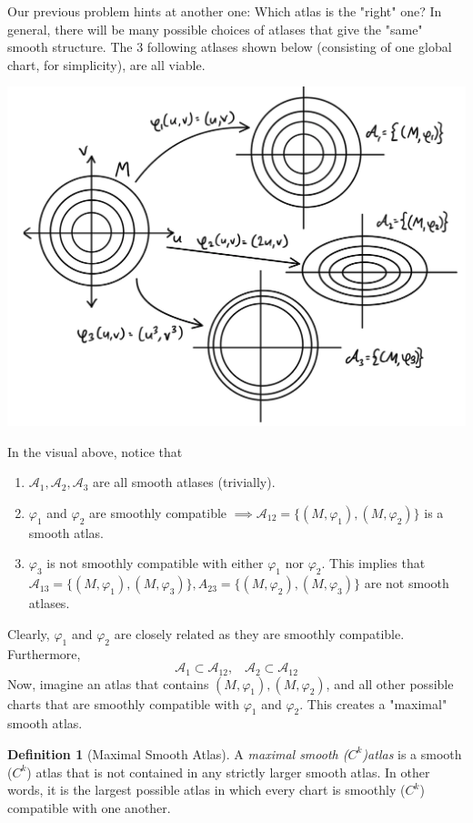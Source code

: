\documentclass{article}
\theoremstyle{remark}
\theoremstyle{definition}
\newtheorem{definition}{Definition}[section]
\begin{document}
Our previous problem hints at another one: Which atlas is the "right" one? In general, there will be many possible choices of atlases that give the "same" smooth structure. The 3 following atlases shown below (consisting of one global chart, for simplicity), are all viable. 
\begin{center}
    \includegraphics[scale=0.32]{img/Different_Atlases.PNG}
\end{center}
In the visual above, notice that
\begin{enumerate}
    \item $\mathcal{A}_1, \mathcal{A}_2, \mathcal{A}_3$ are all smooth atlases (trivially).
    \item $\varphi_1$ and $\varphi_2$ are smoothly compatible $\implies \mathcal{A}_{12} = \{(M, \varphi_1), (M, \varphi_2)\}$ is a smooth atlas. 
    \item $\varphi_3$ is not smoothly compatible with either $\varphi_1$ nor $\varphi_2$. This implies that $\mathcal{A}_{13} = \{(M, \varphi_1), (M, \varphi_3)\}, A_{23} = \{(M, \varphi_2), (M, \varphi_3)\}$ are not smooth atlases.
\end{enumerate}
Clearly, $\varphi_1$ and $\varphi_2$ are closely related as they are smoothly compatible. Furthermore, 
\[\mathcal{A}_1 \subset \mathcal{A}_{12}, \;\;\; \mathcal{A}_2 \subset \mathcal{A}_{12}\]
Now, imagine an atlas that contains $(M, \varphi_1), (M,\varphi_2)$, and all other possible charts that are smoothly compatible with $\varphi_1$ and $\varphi_2$. This creates a "maximal" smooth atlas. 

\begin{definition}[Maximal Smooth Atlas]
A \textit{maximal smooth ($C^k$)atlas} is a smooth ($C^k$) atlas that is not contained in any strictly larger smooth atlas. In other words, it is the largest possible atlas in which every chart is smoothly ($C^k$) compatible with one another. 
\end{definition}
\end{document}
